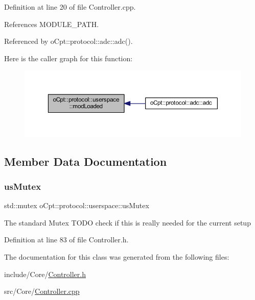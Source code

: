 Definition at line 20 of file Controller.\+cpp.



References M\+O\+D\+U\+L\+E\+\_\+\+P\+A\+TH.



Referenced by o\+Cpt\+::protocol\+::adc\+::adc().

Here is the caller graph for this function\+:\nopagebreak
\begin{figure}[H]
\begin{center}
\leavevmode
\includegraphics[width=350pt]{classo_cpt_1_1protocol_1_1userspace_aac8635fbc254fff76642cf6910484a02_icgraph}
\end{center}
\end{figure}


\subsection{Member Data Documentation}
\hypertarget{classo_cpt_1_1protocol_1_1userspace_a8b03459e89a6ea65ed3f9cd4c38430dd}{}\label{classo_cpt_1_1protocol_1_1userspace_a8b03459e89a6ea65ed3f9cd4c38430dd} 
\subsubsection{\texorpdfstring{us\+Mutex}{usMutex}}
{\footnotesize\ttfamily std\+::mutex o\+Cpt\+::protocol\+::userspace\+::us\+Mutex\hspace{0.3cm}{\ttfamily [protected]}}

The standard Mutex T\+O\+DO check if this is really needed for the current setup 

Definition at line 83 of file Controller.\+h.



The documentation for this class was generated from the following files\+:\begin{DoxyCompactItemize}
\item 
include/\+Core/\hyperlink{_controller_8h}{Controller.\+h}\item 
src/\+Core/\hyperlink{_controller_8cpp}{Controller.\+cpp}\end{DoxyCompactItemize}
